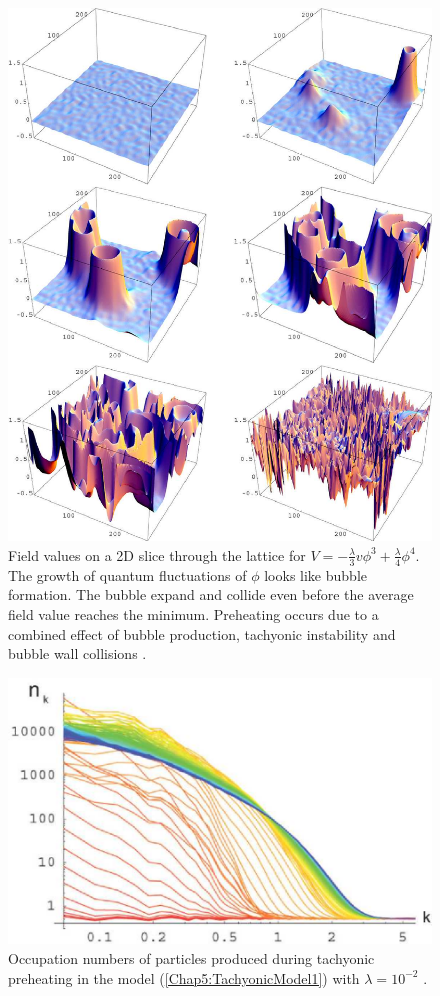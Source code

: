 \documentclass[11pt,a4paper,twoside]{book}
\begin{document}
\begin{figure}
	\centering
	\includegraphics[width=0.7\linewidth, height=0.5\textheight]{Images/Chap5/TachyonicInstability_Fig12}
	\caption{Field values on a 2D slice through the lattice for $ V=-\frac{\lambda}{3}v\phi^{3} + \frac{\lambda}{4}\phi^{4} $. The growth of quantum fluctuations of $\phi$ looks like bubble formation. The bubble expand and collide even before the average field value reaches the minimum. Preheating occurs due to a combined effect of bubble production, tachyonic instability and bubble wall collisions \cite{Chap5:TachyonicInstability}.}
	\label{fig:tachyonicinstabilityfig12}
\end{figure}
\begin{figure}
	\centering
	\includegraphics[width=0.6\linewidth, height=0.25\textheight]{Images/Chap5/TachyonicInstability_Fig14}
	\caption{Occupation numbers of particles produced during tachyonic preheating in the model (\ref{Chap5:TachyonicModel1}) with $\lambda = 10^{-2}$ \cite{Chap5:TachyonicInstability}.}
	\label{fig:tachyonicinstabilityfig14}
\end{figure}
\end{document}
